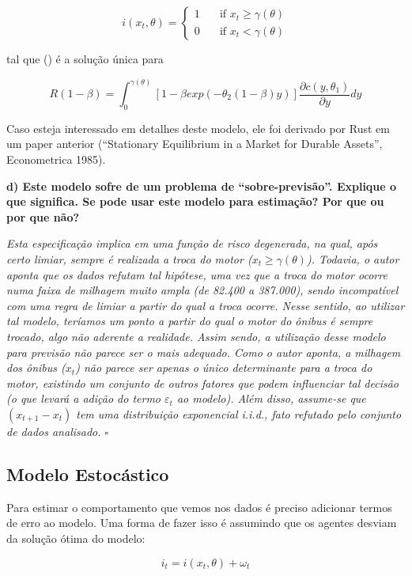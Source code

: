 \documentclass[12pt,a4paper]{article}
\begin{document}
\[ i(x_t,\theta) = 
  \begin{cases}
    1    & \quad \text{if } x_t \ge \gamma(\theta) \\
    0    & \quad \text{if } x_t < \gamma(\theta)
  \end{cases}
\]

tal que \gamma(\theta) é a solução única para

\[R(1-\beta) = \int_0^{\gamma(\theta)}[1 - \beta exp(-\theta_2(1 - \beta)y)]\frac{\partial c(y,\theta_1)}{\partial y}dy\]

Caso esteja interessado em detalhes deste modelo, ele foi derivado por
Rust em um paper anterior (``Stationary Equilibrium in a Market for
Durable Assets'', Econometrica 1985).

\textbf{d) Este modelo sofre de um problema de ``sobre-previsão''.
Explique o que significa. Se pode usar este modelo para estimação? Por
que ou por que não?}

\emph{Esta especificação implica em uma função de risco degenerada, na
qual, após certo limiar, sempre é realizada a troca do motor
(\(x_t \ge \gamma(\theta)\)). Todavia, o autor aponta que os dados
refutam tal hipótese, uma vez que a troca do motor ocorre numa faixa de
milhagem muito ampla (de 82.400 a 387.000), sendo incompatível com uma
regra de limiar a partir do qual a troca ocorre. Nesse sentido, ao
utilizar tal modelo, teríamos um ponto a partir do qual o motor do
ônibus é sempre trocado, algo não aderente a realidade. Assim sendo, a
utilização desse modelo para previsão não parece ser o mais adequado.
Como o autor aponta, a milhagem dos ônibus (\(x_t\)) não parece ser
apenas o único determinante para a troca do motor, existindo um conjunto
de outros fatores que podem influenciar tal decisão (o que levará a
adição do termo \(\varepsilon_t\) ao modelo). Além disso, assume-se que
\((x_{t+1}-x_t)\) tem uma distribuição exponencial i.i.d., fato refutado
pelo conjunto de dados analisado. \(\square\)}

\hypertarget{modelo-estocastico}{%
\subsection{Modelo Estocástico}\label{modelo-estocastico}}

Para estimar o comportamento que vemos nos dados é preciso adicionar
termos de erro ao modelo. Uma forma de fazer isso é assumindo que os
agentes desviam da solução ótima do modelo:

\[i_t = i(x_t, \theta) + \omega_t\]
\end{document}
